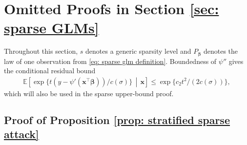 \documentclass[letterpaper,12pt]{article}
\numberwithin{equation}{section}
\theoremstyle{plain}
\numberwithin{Theorem}{section}
\numberwithin{proposition}{section}
\numberwithin{Lemma}{section}
{
	\theoremstyle{definition}
	\newtheorem{Definition}{Definition}
	\newtheorem{example}{Example}
	\numberwithin{example}{section}
	\newtheorem{fact}{Fact}
	\numberwithin{fact}{section}
	\newtheorem{remark}{Remark}
}
\newcommand{\1}{\mathbbm{1}}
\def\bbeta{{\boldsymbol{\beta}}}
\def\E{\mathbb{E}}
\begin{document}
\section{Omitted Proofs in Section \ref{sec: sparse GLMs}}\label{sec: sparse glm proofs}

\begingroup


Throughout this section, $s$ denotes a generic sparsity level and $P_{\bbeta}$ denotes the law of one observation from \eqref{eq: sparse glm definition}.
Boundedness of $\psi''$ gives the conditional residual bound
\begin{align}
    \E\!\left[
    \exp\{t(y-\psi'(\bm x^\top\bbeta))/c(\sigma)\}
    \,\middle|\,\bm x
    \right]
    \leq \exp\{c_2t^2/(2c(\sigma))\},                       \label{eq: sparse glm residual mgf}
\end{align}
which will also be used in the sparse upper-bound proof.

\subsection{Proof of Proposition \ref{prop: stratified sparse attack}}\label{sec: proof of prop: stratified sparse attack}
\end{document}
